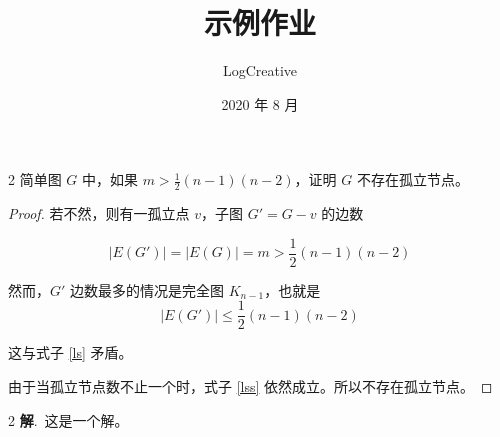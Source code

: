 \documentclass[a4paper,12pt]{article}
\title{示例作业}
\author{LogCreative}
\date{2020 年 8 月}
\newenvironment{firstlayer}{\begin{list}{}{\renewcommand{\makelabel}[1]{\textbf{##1}.\hfil}}}{\end{list}}
\newenvironment{secondlayer}{\begin{list}{}{\renewcommand{\makelabel}[1]{(##1)\hfil}}}{\end{list}}
\providecommand{\sol}{\textbf{解}.~}
\begin{document}
\begin{CJK}{UTF8}{song}
\maketitle

\begin{firstlayer}

\item[2] 简单图 $G$ 中，如果 $m>\frac{1}{2}(n-1)(n-2)$，证明 $G$ 不存在孤立节点。

\begin{proof}
    若不然，则有一孤立点 $v$，子图 $G'=G-v$ 的边数

    \begin{equation}\label{ls}
        \left\lvert E(G')\right\rvert = \left\lvert E(G)\right\rvert = m>\frac{1}{2}(n-1)(n-2) 
    \end{equation}

    然而，$G'$ 边数最多的情况是完全图 $K_{n-1}$，也就是
    \begin{equation}\label{lss}
        \left\lvert E(G')\right\rvert \leq \frac{1}{2}(n-1)(n-2)
    \end{equation}

    这与式子 \eqref{ls} 矛盾。

    由于当孤立节点数不止一个时，式子 \eqref{lss} 依然成立。所以不存在孤立节点。

\end{proof}

\begin{secondlayer}

    \item[2] \sol 这是一个解。

\end{secondlayer}

\end{firstlayer}

\end{CJK}
\end{document}
